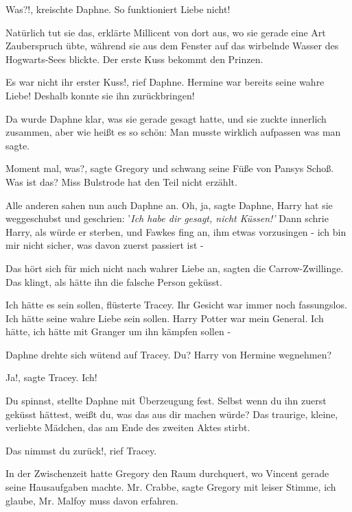 \glqq{}Was?!\grqq{}, kreischte Daphne. \glqq{}So funktioniert Liebe nicht!\grqq{}

\glqq{}Natürlich tut sie das\grqq{}, erklärte Millicent von dort aus, wo sie
gerade eine Art Zauberspruch übte, während sie aus dem Fenster auf das wirbelnde
Wasser des Hogwarts-Sees blickte. \glqq{}Der erste Kuss bekommt den Prinzen.\grqq{}

\glqq{}Es war nicht ihr erster Kuss!\grqq{}, rief Daphne. \glqq{}Hermine war
bereits seine wahre Liebe! Deshalb konnte sie ihn zurückbringen!\grqq{}

Da wurde Daphne klar, was sie gerade gesagt hatte, und sie zuckte innerlich
zusammen, aber wie heißt es so schön: Man musste wirklich aufpassen was man
sagte.

\glqq{}Moment mal, was?\grqq{}, sagte Gregory und schwang seine Füße von Pansys
Schoß. \glqq{}Was ist das? Miss Bulstrode hat den Teil nicht erzählt.\grqq{}

Alle anderen sahen nun auch Daphne an. \glqq{}Oh, ja\grqq{}, sagte Daphne, \glqq{}
Harry hat sie weggeschubst und geschrien: '\emph{Ich habe dir gesagt, nicht
Küssen!'} Dann schrie Harry, als würde er sterben, und Fawkes fing an, ihm etwas
vorzusingen - ich bin mir nicht sicher, was davon zuerst passiert ist -\grqq{}

\glqq{}Das hört sich für mich nicht nach wahrer Liebe an\grqq{}, sagten die
Carrow-Zwillinge. \glqq{}Das klingt, als hätte ihn die falsche Person geküsst.\grqq{}

\glqq{}Ich hätte es sein sollen\grqq{}, flüsterte Tracey. Ihr Gesicht war immer
noch fassungslos. \glqq{}Ich hätte seine wahre Liebe sein sollen. Harry Potter
war mein General. Ich hätte, ich hätte mit Granger um ihn kämpfen sollen -\grqq{}

Daphne drehte sich wütend auf Tracey. \glqq{}Du? Harry von Hermine wegnehmen?\grqq{}

\glqq{}Ja!\grqq{}, sagte Tracey. \glqq{}Ich!\grqq{}

\glqq{}Du spinnst\grqq{}, stellte Daphne mit Überzeugung fest. \glqq{}Selbst wenn
du ihn zuerst geküsst hättest, weißt du, was das aus dir machen würde? Das
traurige, kleine, verliebte Mädchen, das am Ende des zweiten Aktes stirbt.\grqq{}

\glqq{}Das nimmst du zurück!\grqq{}, rief Tracey.

In der Zwischenzeit hatte Gregory den Raum durchquert, wo Vincent gerade seine
Hausaufgaben machte. \glqq{}Mr. Crabbe\grqq{}, sagte Gregory mit leiser Stimme,
\glqq{}ich glaube, Mr. Malfoy muss davon erfahren.\grqq{}

